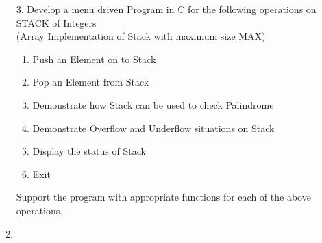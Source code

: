 \documentclass{article}
\newcommand{\answer}{\item [$\rightarrow$]}
\begin{document}
	\begin{enumerate}
		\item [3.] Develop a menu driven Program in C for the following operations on STACK of Integers \\
		(Array Implementation of Stack with maximum size MAX)
		\begin{enumerate}[label=\alph*.]
			\item Push an Element on to Stack
			\item Pop an Element from Stack
			\item Demonstrate how Stack can be used to check Palindrome
			\item Demonstrate Overflow and Underflow situations on Stack
			\item Display the status of Stack
			\item Exit
		\end{enumerate}
		Support the program with appropriate functions for each of the above operations.
		\answer \inputminted{c}{../Program3.c}
	\end{enumerate}
\end{document}
